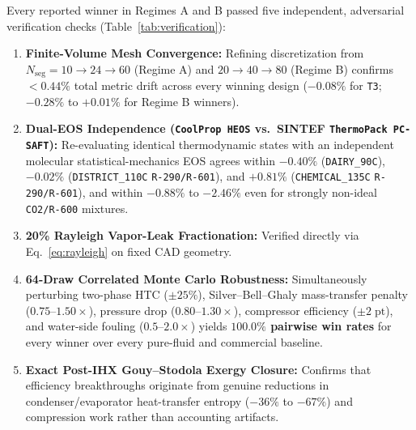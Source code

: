 \documentclass[twocolumn,10pt]{article}
\begin{document}
Every reported winner in Regimes A and B passed five independent, adversarial verification checks (Table~\ref{tab:verification}):
\begin{enumerate}\setlength{\itemsep}{1pt}
  \item \textbf{Finite-Volume Mesh Convergence:} Refining discretization from $N_{\text{seg}}=10\to 24\to 60$ (Regime A) and $20\to 40\to 80$ (Regime B) confirms $<0.44\%$ total metric drift across every winning design ($-0.08\%$ for \texttt{T3}; $-0.28\%$ to $+0.01\%$ for Regime B winners).
  \item \textbf{Dual-EOS Independence (\texttt{CoolProp HEOS} vs.\ SINTEF \texttt{ThermoPack PC-SAFT}):} Re-evaluating identical thermodynamic states with an independent molecular statistical-mechanics EOS agrees within $-0.40\%$ (\texttt{DAIRY\_90C}), $-0.02\%$ (\texttt{DISTRICT\_110C} \texttt{R-290/R-601}), and $+0.81\%$ (\texttt{CHEMICAL\_135C} \texttt{R-290/R-601}), and within $-0.88\%$ to $-2.46\%$ even for strongly non-ideal \texttt{CO2/R-600} mixtures.
  \item \textbf{20\% Rayleigh Vapor-Leak Fractionation:} Verified directly via Eq.~\eqref{eq:rayleigh} on fixed CAD geometry.
  \item \textbf{64-Draw Correlated Monte Carlo Robustness:} Simultaneously perturbing two-phase HTC ($\pm 25\%$), Silver--Bell--Ghaly mass-transfer penalty ($0.75\text{--}1.50\times$), pressure drop ($0.80\text{--}1.30\times$), compressor efficiency ($\pm 2\;\text{pt}$), and water-side fouling ($0.5\text{--}2.0\times$) yields \textbf{$100.0\%$ pairwise win rates} for every winner over every pure-fluid and commercial baseline.
  \item \textbf{Exact Post-IHX Gouy--Stodola Exergy Closure:} Confirms that efficiency breakthroughs originate from genuine reductions in condenser/evaporator heat-transfer entropy ($-36\%$ to $-67\%$) and compression work rather than accounting artifacts.
\end{enumerate}
\end{document}
